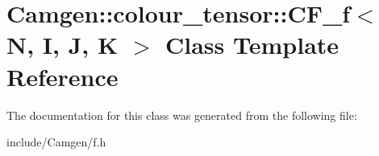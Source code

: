 \hypertarget{a00032}{}\section{Camgen\+:\+:colour\+\_\+tensor\+:\+:C\+F\+\_\+f$<$ N, I, J, K $>$ Class Template Reference}
\label{a00032}


The documentation for this class was generated from the following file\+:\begin{DoxyCompactItemize}
\item 
include/\+Camgen/f.\+h\end{DoxyCompactItemize}
